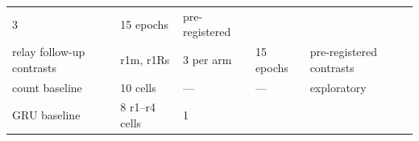 \documentclass[10pt]{article}
\begin{document}
\begin{longtable}[]{@{}lllll@{}}
\begin{minipage}[t]{0.17\columnwidth}
3\strut
\end{minipage} & \begin{minipage}[t]{0.17\columnwidth}\raggedright
15 epochs\strut
\end{minipage} & \begin{minipage}[t]{0.17\columnwidth}\raggedright
pre-registered\strut
\end{minipage}\tabularnewline
\begin{minipage}[t]{0.17\columnwidth}\raggedright
relay follow-up contrasts\strut
\end{minipage} & \begin{minipage}[t]{0.17\columnwidth}\raggedright
r1m, r1Rs\strut
\end{minipage} & \begin{minipage}[t]{0.17\columnwidth}\raggedright
3 per arm\strut
\end{minipage} & \begin{minipage}[t]{0.17\columnwidth}\raggedright
15 epochs\strut
\end{minipage} & \begin{minipage}[t]{0.17\columnwidth}\raggedright
pre-registered contrasts\strut
\end{minipage}\tabularnewline
\begin{minipage}[t]{0.17\columnwidth}\raggedright
count baseline\strut
\end{minipage} & \begin{minipage}[t]{0.17\columnwidth}\raggedright
10 cells\strut
\end{minipage} & \begin{minipage}[t]{0.17\columnwidth}\raggedright
---\strut
\end{minipage} & \begin{minipage}[t]{0.17\columnwidth}\raggedright
---\strut
\end{minipage} & \begin{minipage}[t]{0.17\columnwidth}\raggedright
exploratory\strut
\end{minipage}\tabularnewline
\begin{minipage}[t]{0.17\columnwidth}\raggedright
GRU baseline\strut
\end{minipage} & \begin{minipage}[t]{0.17\columnwidth}\raggedright
8 r1--r4 cells\strut
\end{minipage} & \begin{minipage}[t]{0.17\columnwidth}\raggedright
1\strut
\end{minipage} & \begin{minipage}[t]{0.17\columnwidth}\raggedright

\end{minipage}
\end{longtable}
\end{document}

